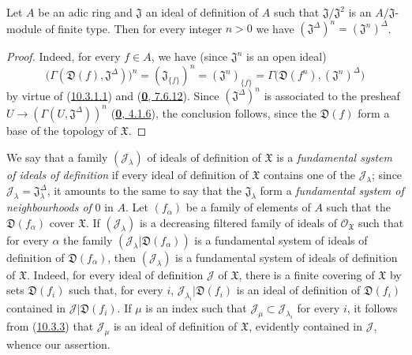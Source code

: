\begin{proposition}[10.3.6]
\label{I.10.3.6}
Let $A$ be an adic ring and $\mathfrak{J}$ an ideal of definition of $A$
such that $\mathfrak{J}/\mathfrak{J}^2$ is an
$A/\mathfrak{J}$-module of finite type. Then for every integer $n>0$ we
have $(\mathfrak{J}^\Delta)^n=(\mathfrak{J}^n)^\Delta$.
\end{proposition}

\begin{proof}
Indeed, for every $f\in A$, we have (since $\mathfrak{J}^n$ is an open
ideal)
\[
  \bigl(\Gamma(\mathfrak{D}(f),\mathfrak{J}^\Delta)\bigr)^n
  =(\mathfrak{J}_{\{f\}})^n
  =(\mathfrak{J}^n)_{\{f\}}
  =\Gamma\bigl(\mathfrak{D}(f^n),(\mathfrak{J}^n)^\Delta\bigr)
\]
by virtue of (\hyperref[I.10.3.1.1]{10.3.1.1}) and
(\hyperref[0.7.6.12]{\textbf{0}, 7.6.12}). Since
$(\mathfrak{J}^\Delta)^n$ is associated to the presheaf
$U\to(\Gamma(U,\mathfrak{J}^\Delta))^n$
(\hyperref[0.4.1.6]{\textbf{0}, 4.1.6}), the conclusion follows, since the
$\mathfrak{D}(f)$ form a base of the topology of $\mathfrak{X}$.
\end{proof}

\begin{env}[10.3.7]
\label{I.10.3.7}
We say that a family $(\mathscr{J}_\lambda)$ of ideals of definition of
$\mathfrak{X}$ is a \emph{fundamental system of ideals of definition}
if every ideal of definition of $\mathfrak{X}$ contains one of the
$\mathscr{J}_\lambda$; since
$\mathscr{J}_\lambda=\mathfrak{J}_\lambda^\Delta$, it amounts to the same to
say that the $\mathfrak{J}_\lambda$ form a \emph{fundamental system
of neighbourhoods of} 0 in $A$. Let $(f_\alpha)$ be a family of elements of
$A$ such that the $\mathfrak{D}(f_\alpha)$ cover $\mathfrak{X}$. If
$(\mathscr{J}_\lambda)$ is a decreasing filtered family of ideals of
$\mathscr{O}_{\mathfrak{X}}$ such that for every $\alpha$ the family
$(\mathscr{J}_\lambda|\mathfrak{D}(f_\alpha))$ is a fundamental system
of ideals of definition of $\mathfrak{D}(f_\alpha)$, then
$(\mathscr{J}_\lambda)$ is a fundamental system of ideals of definition
of $\mathfrak{X}$. Indeed, for every ideal of definition $\mathscr{J}$
of $\mathfrak{X}$, there is a finite covering of $\mathfrak{X}$ by sets
$\mathfrak{D}(f_i)$ such that, for every $i$,
$\mathscr{J}_{\lambda_i}|\mathfrak{D}(f_i)$ is an ideal of definition
of $\mathfrak{D}(f_i)$ contained in
$\mathscr{J}|\mathfrak{D}(f_i)$. If $\mu$ is an index such that
$\mathscr{J}_\mu\subset\mathscr{J}_{\lambda_i}$ for every $i$, it follows
from (\hyperref[I.10.3.3]{10.3.3}) that $\mathscr{J}_\mu$ is an ideal of
definition of $\mathfrak{X}$, evidently contained in $\mathscr{J}$, whence
our assertion.
\end{env}

